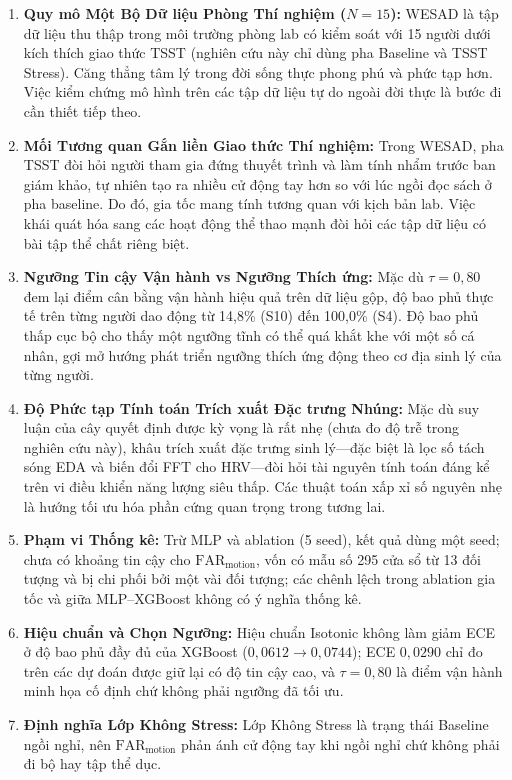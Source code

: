 \documentclass[conference]{IEEEtran}
\begin{document}
\begin{enumerate}
    \item \textbf{Quy mô Một Bộ Dữ liệu Phòng Thí nghiệm ($N=15$):} WESAD là tập dữ liệu thu thập trong môi trường phòng lab có kiểm soát với 15 người dưới kích thích giao thức TSST (nghiên cứu này chỉ dùng pha Baseline và TSST Stress). Căng thẳng tâm lý trong đời sống thực phong phú và phức tạp hơn. Việc kiểm chứng mô hình trên các tập dữ liệu tự do ngoài đời thực là bước đi cần thiết tiếp theo.
    \item \textbf{Mối Tương quan Gắn liền Giao thức Thí nghiệm:} Trong WESAD, pha TSST đòi hỏi người tham gia đứng thuyết trình và làm tính nhẩm trước ban giám khảo, tự nhiên tạo ra nhiều cử động tay hơn so với lúc ngồi đọc sách ở pha baseline. Do đó, gia tốc mang tính tương quan với kịch bản lab. Việc khái quát hóa sang các hoạt động thể thao mạnh đòi hỏi các tập dữ liệu có bài tập thể chất riêng biệt.
    \item \textbf{Ngưỡng Tin cậy Vận hành vs Ngưỡng Thích ứng:} Mặc dù $\tau = 0,80$ đem lại điểm cân bằng vận hành hiệu quả trên dữ liệu gộp, độ bao phủ thực tế trên từng người dao động từ 14,8\% (S10) đến 100,0\% (S4). Độ bao phủ thấp cục bộ cho thấy một ngưỡng tĩnh có thể quá khắt khe với một số cá nhân, gợi mở hướng phát triển ngưỡng thích ứng động theo cơ địa sinh lý của từng người.
    \item \textbf{Độ Phức tạp Tính toán Trích xuất Đặc trưng Nhúng:} Mặc dù suy luận của cây quyết định được kỳ vọng là rất nhẹ (chưa đo độ trễ trong nghiên cứu này), khâu trích xuất đặc trưng sinh lý—đặc biệt là lọc số tách sóng EDA và biến đổi FFT cho HRV—đòi hỏi tài nguyên tính toán đáng kể trên vi điều khiển năng lượng siêu thấp. Các thuật toán xấp xỉ số nguyên nhẹ là hướng tối ưu hóa phần cứng quan trọng trong tương lai.
    \item \textbf{Phạm vi Thống kê:} Trừ MLP và ablation (5 seed), kết quả dùng một seed; chưa có khoảng tin cậy cho $\text{FAR}_{\text{motion}}$, vốn có mẫu số 295 cửa sổ từ 13 đối tượng và bị chi phối bởi một vài đối tượng; các chênh lệch trong ablation gia tốc và giữa MLP--XGBoost không có ý nghĩa thống kê.
    \item \textbf{Hiệu chuẩn và Chọn Ngưỡng:} Hiệu chuẩn Isotonic không làm giảm ECE ở độ bao phủ đầy đủ của XGBoost ($0,0612\rightarrow0,0744$); ECE $0,0290$ chỉ đo trên các dự đoán được giữ lại có độ tin cậy cao, và $\tau=0,80$ là điểm vận hành minh họa cố định chứ không phải ngưỡng đã tối ưu.
    \item \textbf{Định nghĩa Lớp Không Stress:} Lớp Không Stress là trạng thái Baseline ngồi nghỉ, nên $\text{FAR}_{\text{motion}}$ phản ánh cử động tay khi ngồi nghỉ chứ không phải đi bộ hay tập thể dục.
\end{enumerate}
\end{document}
